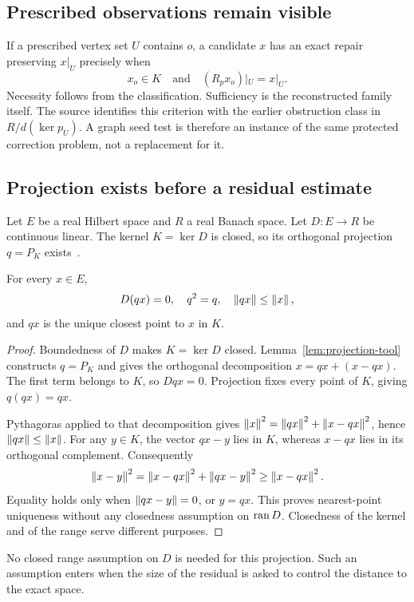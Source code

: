 \subsection{Prescribed observations remain visible}
If a prescribed vertex set \(U\) contains \(o\), a candidate \(x\) has an exact repair preserving \(x|_U\) precisely when
\[
 x_o\in K\quad\text{and}\quad (R_px_o)|_U=x|_U.
\]
Necessity follows from the classification. Sufficiency is the reconstructed family itself. The source identifies this criterion with the earlier obstruction class in \(R/d(\ker p_U)\). A graph seed test is therefore an instance of the same protected correction problem, not a replacement for it.

\label{sec:closed}
\subsection{Projection exists before a residual estimate}
Let \(E\) be a real Hilbert space and \(R\) a real Banach space. Let \(D:E\to R\) be continuous linear. The kernel \(K=\ker D\) is closed, so its orthogonal projection \(q=P_K\) exists~\cite{mathlib-projection}.

\begin{proposition}\label{KS42}
For every \(x\in E\),
\[
 D(qx)=0,\quad q^2=q,\quad\left\lVert qx\right\rVert\le\left\lVert x\right\rVert,
\]
and \(qx\) is the unique closest point to \(x\) in \(K\).
\end{proposition}
\begin{proof}
Boundedness of \(D\) makes \(K=\ker D\) closed. Lemma~\ref{lem:projection-tool} constructs \(q=P_K\) and gives the orthogonal decomposition \(x=qx+(x-qx)\). The first term belongs to \(K\), so \(Dqx=0\). Projection fixes every point of \(K\), giving \(q(qx)=qx\).

Pythagoras applied to that decomposition gives \(\left\lVert x\right\rVert^2=\left\lVert qx\right\rVert^2+\left\lVert x-qx\right\rVert^2\), hence \(\left\lVert qx\right\rVert\le\left\lVert x\right\rVert\). For any \(y\in K\), the vector \(qx-y\) lies in \(K\), whereas \(x-qx\) lies in its orthogonal complement. Consequently
\[
 \left\lVert x-y\right\rVert^2=\left\lVert x-qx\right\rVert^2+\left\lVert qx-y\right\rVert^2\ge\left\lVert x-qx\right\rVert^2.
\]
Equality holds only when \(\left\lVert qx-y\right\rVert=0\), or \(y=qx\). This proves nearest-point uniqueness without any closedness assumption on \(\operatorname{ran} D\). Closedness of the kernel and of the range serve different purposes.
\end{proof}
No closed range assumption on \(D\) is needed for this projection. Such an assumption enters when the size of the residual is asked to control the distance to the exact space.

